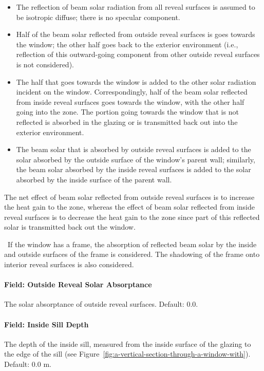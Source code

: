 \begin{itemize}
\item
  The reflection of beam solar radiation from all reveal surfaces is assumed to be isotropic diffuse; there is no specular component.
\item
  Half of the beam solar reflected from outside reveal surfaces is goes towards the window; the other half goes back to the exterior environment (i.e., reflection of this outward-going component from other outside reveal surfaces is not considered).
\item
  The half that goes towards the window is added to the other solar radiation incident on the window. Correspondingly, half of the beam solar reflected from inside reveal surfaces goes towards the window, with the other half going into the zone. The portion going towards the window that is not reflected is absorbed in the glazing or is transmitted back out into the exterior environment.
\item
  The beam solar that is absorbed by outside reveal surfaces is added to the solar absorbed by the outside surface of the window's parent wall; similarly, the beam solar absorbed by the inside reveal surfaces is added to the solar absorbed by the inside surface of the parent wall.
\end{itemize}

The net effect of beam solar reflected from outside reveal surfaces is to increase the heat gain to the zone, whereas the effect of beam solar reflected from inside reveal surfaces is to decrease the heat gain to the zone since part of this reflected solar is transmitted back out the window.

~If the window has a frame, the absorption of reflected beam solar by the inside and outside surfaces of the frame is considered. The shadowing of the frame onto interior reveal surfaces is also considered.

\paragraph{Field: Outside Reveal Solar Absorptance}\label{field-outside-reveal-solar-absorptance}

The solar absorptance of outside reveal surfaces. Default: 0.0.

\paragraph{Field: Inside Sill Depth}\label{field-inside-sill-depth}

The depth of the inside sill, measured from the inside surface of the glazing to the edge of the sill (see Figure~\ref{fig:a-vertical-section-through-a-window-with}). Default: 0.0 m.

